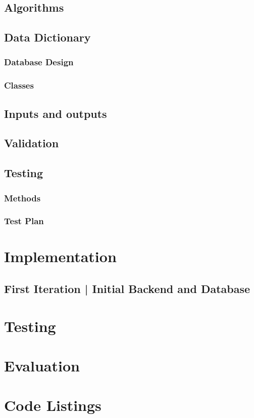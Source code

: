 \documentclass[11pt,a4paper]{article}
\begin{document}
\pagebreak
\subsection{Algorithms}


\pagebreak
\subsection{Data Dictionary}

\subsubsection{Database Design}


\pagebreak
\subsubsection{Classes}


\subsection{Inputs and outputs}

\subsection{Validation}

\subsection{Testing}

\subsubsection{Methods}

\subsubsection{Test Plan}

\pagebreak

\section{Implementation}

\subsection{First Iteration | Initial Backend and Database}



\pagebreak

\section{Testing}

\section{Evaluation}

\section{Code Listings}
\end{document}
